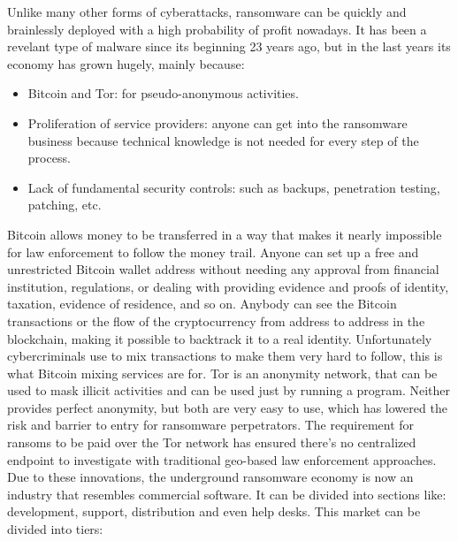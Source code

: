 \linej
\linej
Unlike many other forms of cyberattacks, ransomware can be quickly and brainlessly deployed with a high probability of profit nowadays.
It has been a revelant type of malware since its beginning 23 years ago, but in the last years its economy has grown hugely, mainly because\cite{ransomware_digital_extortion}\cite{ransomware_economy}:
\begin{itemize}
	\item Bitcoin and Tor: for pseudo-anonymous activities.
	\item Proliferation of service providers: anyone can get into the ransomware business because technical knowledge is not needed for every step of the process.
	\item Lack of fundamental security controls: such as backups, penetration testing, patching, etc.
\end{itemize}
\linej
Bitcoin allows money to be transferred in a way that makes it nearly impossible for law enforcement to follow the money trail.
Anyone can set up a free and unrestricted Bitcoin wallet address without needing any approval from financial institution, regulations, or dealing with providing evidence and proofs of identity, taxation, evidence of residence, and so on.
Anybody can see the Bitcoin transactions or the flow of the cryptocurrency from address to address in the blockchain, making it possible to backtrack it to a real identity.
Unfortunately cybercriminals use to mix transactions to make them very hard to follow, this is what Bitcoin mixing services are for.
\linej
Tor is an anonymity network, that can be used to mask illicit activities and can be used just by running a program.
\linej
Neither provides perfect anonymity, but both are very easy to use, which has lowered the risk and barrier to entry for ransomware perpetrators.
The requirement for ransoms to be paid over the Tor network has ensured there's no centralized endpoint to investigate with traditional geo-based law enforcement approaches\cite{ransomware_digital_extortion}.
\linej
\linej
Due to these innovations, the underground ransomware economy is now an industry that resembles commercial software. It can be divided into sections like: development, support, distribution and even help desks. This market can be divided into tiers\cite{ransomware_economy}:
